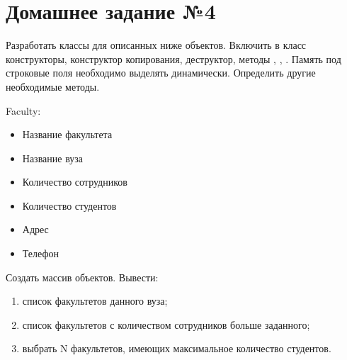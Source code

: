 \section*{Домашнее задание №4}

Разработать классы для описанных ниже объектов. Включить в класс
конструкторы, конструктор копирования, деструктор, методы ,
, . Память под строковые поля необходимо выделять
динамически. Определить другие необходимые методы.

Faculty:
\begin{itemize}
	\item Название факультета
	\item Название вуза
	\item Количество сотрудников
	\item Количество студентов
	\item Адрес
	\item Телефон
\end{itemize}

Создать массив объектов. Вывести:
\begin{enumerate}
	\item список факультетов данного вуза;
	\item список факультетов с количеством сотрудников больше заданного;
	\item выбрать N факультетов, имеющих максимальное количество студентов.
\end{enumerate}
